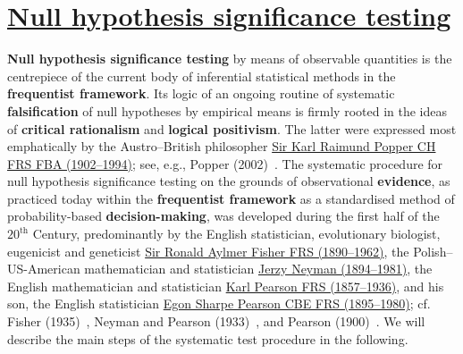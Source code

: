 \chapter[Null hypothesis significance testing]{\href{https://www.youtube.com/watch?v=jnLHSyYQ1LE}{Null hypothesis significance testing}}
\textbf{Null hypothesis significance testing} by means of
observable quantities is the centrepiece of the current body of
inferential statistical methods in the \textbf{frequentist
framework}. Its logic of an ongoing routine of systematic
\textbf{falsification} of null hypotheses by empirical means is
firmly rooted in the ideas of \textbf{critical rationalism} and
\textbf{logical positivism}. The latter were expressed most
emphatically by the Austro--British 
philosopher \href{http://en.wikipedia.org/wiki/Karl_Popper}{Sir 
Karl Raimund Popper CH FRS FBA (1902--1994)}; see, e.g., Popper 
(2002)~. The systematic procedure for null hypothesis
significance testing on the grounds of observational
\textbf{evidence}, as practiced today within the
\textbf{frequentist framework} as a standardised method of
probability-based \textbf{decision-making}, was developed during
the first half of the $20^\mathrm{th}$ Century, predominantly by
the English statistician, evolutionary biologist, 
eugenicist and geneticist
\href{http://www-history.mcs.st-and.ac.uk/Biographies/Fisher.html}{Sir
Ronald Aylmer Fisher FRS (1890--1962)}, the 
Polish--US-American mathematician and statistician
\href{http://www-history.mcs.st-and.ac.uk/Biographies/Neyman.html}{Jerzy Neyman (1894--1981)}, the English mathematician and statistician
\href{http://www-history.mcs.st-and.ac.uk/Biographies/Pearson.html}{Karl Pearson FRS (1857--1936)}, and his son, the English statistician
\href{http://www-history.mcs.st-and.ac.uk/Biographies/Pearson_Egon.html}{Egon Sharpe Pearson CBE FRS (1895--1980)}; cf. Fisher
(1935)~, Neyman and Pearson (1933)~,
and Pearson (1900)~.
We will describe the main steps of the systematic test procedure 
in the following.

